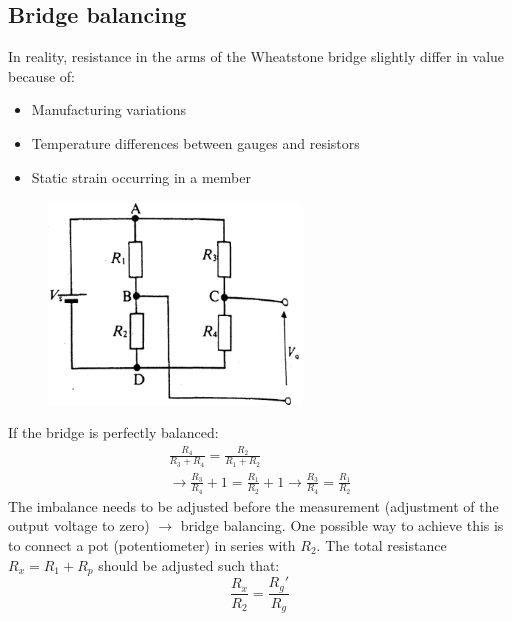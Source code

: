 \documentclass[class=report, crop=false, 12pt,a4paper, tikz, border=4mm]{standalone}
\begin{document}
\subsection{Bridge balancing}
In reality, resistance in the arms of the Wheatstone bridge slightly differ in value because of: 
\begin{itemize}
  \item Manufacturing variations
  \item Temperature differences between gauges and resistors
  \item Static strain occurring in a member
\end{itemize}
\begin{figure}[H]
  \centering
  \includegraphics[width = 0.6\textwidth]{../img/diagram18.png}
\end{figure}
If the bridge is perfectly balanced:
\begin{gather}
  \frac{R_4}{R_3 + R_4} = \frac{R_2}{R_1 +R_2}\\
  \rightarrow \frac{R_3}{R_4} + 1 = \frac{R_1}{R_2} +1 \rightarrow \frac{R_3}{R_4} = \frac{R_1}{R_2}
\end{gather}
The imbalance needs to be adjusted before the measurement (adjustment of the output voltage to zero) $\rightarrow$ bridge balancing. One possible way to achieve this is to connect a pot (potentiometer) in series with $R_2$. The total resistance $R_x = R_1 + R_p$ should be adjusted such that:
\begin{equation}
  \frac{R_x}{R_2} = \frac{R_g'}{R_g}
\end{equation}
\end{document}
